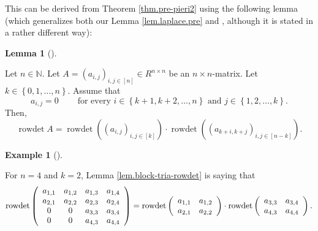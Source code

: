 \documentclass
[numbers=enddot,12pt,final,onecolumn,notitlepage,english]{scrartcl}%
\theoremstyle{definition}
\newtheorem{lem}[theo]{Lemma}
\newenvironment{lemma}[1][]
{\begin{lem}[#1]\begin{leftbar}}
{\end{leftbar}\end{lem}}
\newtheorem{exam}[theo]{Example}
\newenvironment{example}[1][]
{\begin{exam}[#1]\begin{leftbar}}
{\end{leftbar}\end{exam}}
\begin{document}
This can be derived from Theorem \ref{thm.pre-pieri2} using the following
lemma (which generalizes both our Lemma \ref{lem.laplace.pre} and
\cite[Exercise 6.29]{detnotes}, although it is stated in a rather different way):

\begin{lemma}
\label{lem.block-tria-rowdet}Let $n\in\mathbb{N}$. Let $A=\left(
a_{i,j}\right)  _{i,j\in\left[  n\right]  }\in R^{n\times n}$ be an $n\times
n$-matrix. Let $k\in\left\{  0,1,\ldots,n\right\}  $. Assume that%
\[
a_{i,j}=0\ \ \ \ \ \ \ \ \ \ \text{for every }i\in\left\{  k+1,k+2,\ldots
,n\right\}  \text{ and }j\in\left\{  1,2,\ldots,k\right\}  .
\]
Then,
\[
\operatorname*{rowdet}A=\operatorname*{rowdet}\left(  \left(  a_{i,j}\right)
_{i,j\in\left[  k\right]  }\right)  \cdot\operatorname*{rowdet}\left(  \left(
a_{k+i,k+j}\right)  _{i,j\in\left[  n-k\right]  }\right)  .
\]

\end{lemma}

\begin{example}
For $n=4$ and $k=2$, Lemma \ref{lem.block-tria-rowdet} is saying that%
\[
\operatorname*{rowdet}\left(
\begin{array}
[c]{cccc}%
a_{1,1} & a_{1,2} & a_{1,3} & a_{1,4}\\
a_{2,1} & a_{2,2} & a_{2,3} & a_{2,4}\\
0 & 0 & a_{3,3} & a_{3,4}\\
0 & 0 & a_{4,3} & a_{4,4}%
\end{array}
\right)  =\operatorname*{rowdet}\left(
\begin{array}
[c]{cc}%
a_{1,1} & a_{1,2}\\
a_{2,1} & a_{2,2}%
\end{array}
\right)  \cdot\operatorname*{rowdet}\left(
\begin{array}
[c]{cc}%
a_{3,3} & a_{3,4}\\
a_{4,3} & a_{4,4}%
\end{array}
\right)  .
\]

\end{example}
\end{document}
